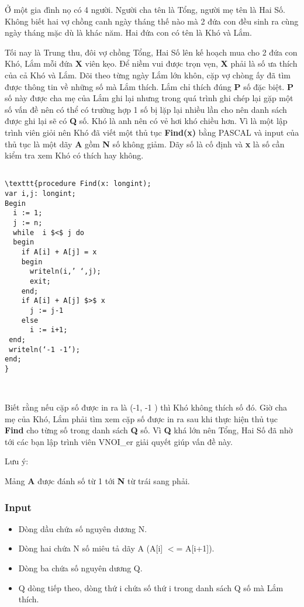 

Ở một gia đình nọ có 4 người. Người cha tên là Tổng, người mẹ tên là Hai Số. Không biết hai vợ chồng canh ngày tháng thế nào mà 2 đứa con đều sinh ra cùng ngày tháng mặc dù là khác năm. Hai đứa con có tên là Khó và Lắm.

Tối nay là Trung thu, đôi vợ chồng Tổng, Hai Số lên kế hoạch mua cho 2 đứa con Khó, Lắm mỗi đứa \textbf{ X } viên kẹo. Để niềm vui được trọn vẹn, \textbf{ X } phải là số ưa thích của cả Khó và Lắm. Dõi theo từng ngày Lắm lớn khôn, cặp vợ chòng ấy đã tìm được thông tin về những số mà Lắm thích. Lắm chỉ thích đúng \textbf{ P } số đặc biệt. \textbf{ P } số này được cha mẹ của Lắm ghi lại nhưng trong quá trình ghi chép lại gặp một số vấn đề nên có thể có trường hợp 1 số bị lặp lại nhiều lần cho nên danh sách được ghi lại sẽ có \textbf{ Q } số. Khó là anh nên có vẻ hơi khó chiều hơn. Vì là một lập trình viên giỏi nên Khó đã viết một thủ tục \textbf{ Find(x) } bằng PASCAL và input của thủ tục là một dãy \textbf{ A } gồm \textbf{ N } số không giảm. Dãy số là cố định và \textbf{ x } là số cần kiểm tra xem Khó có thích hay không.
\begin{verbatim}

\texttt{procedure Find(x: longint);
var i,j: longint;
Begin
  i := 1;
  j := n;
  while  i $<$ j do
  begin 
    if A[i] + A[j] = x 
    begin
      writeln(i,’ ‘,j); 
      exit;
    end; 
    if A[i] + A[j] $>$ x
      j := j-1
    else 
      i := i+1;
 end;
 writeln(‘-1 -1’);
end;
}\end{verbatim}

 

Biết rằng nếu cặp số được in ra là (-1, -1 ) thì Khó không thích số đó. Giờ cha mẹ của Khó, Lắm phải tìm xem cặp số được in ra sau khi thực hiện thủ tục \textbf{ Find } cho từng số trong danh sách \textbf{ Q } số. Vì \textbf{ Q } khá lớn nên Tổng, Hai Số đã nhờ tới các bạn lập trình viên VNOI\_er giải quyết giúp vấn đề này.

Lưu ý:

Mảng \textbf{ A } được đánh số từ 1 tới \textbf{ N } từ trái sang phải.

\subsubsection{\textbf{Input}}
\begin{itemize}
	\item Dòng dầu chứa số nguyên dương N.
	\item Dòng hai chứa N số miêu tả dãy A (A[i] $<$= A[i+1]).
	\item Dòng ba chứa số nguyên dương Q.
	\item Q dòng tiếp theo, dòng thứ i chứa số thứ i trong danh sách Q số mà Lắm thích.
\end{itemize}

